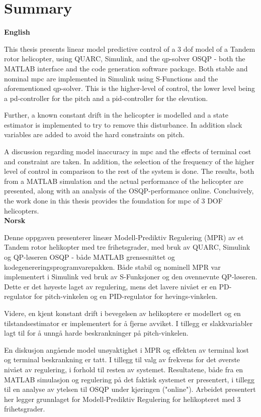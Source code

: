 
\chapter*{Summary}

\textbf{\Large{English}}

This thesis presents linear model predictive control of a 3 \acrshort{dof} model of a Tandem rotor helicopter, using QUARC, Simulink, and the \acrshort{qp}-solver OSQP - both the MATLAB interface and the code generation software package. Both stable and nominal \acrshort{mpc} are implemented in Simulink using S-Functions and the aforementioned \acrshort{qp}-solver. This is the higher-level of control, the lower level being a \acrshort{pd}-controller for the pitch and a \acrshort{pid}-controller for the elevation.

Further, a known constant drift in the helicopter is modelled and a state estimator is implemented to try to remove this disturbance. In addition slack variables are added to avoid the  hard constraints on pitch. 

A discussion regarding model inaccuracy in \acrshort{mpc} and the effects of terminal cost and constraint are taken. In addition, the selection of the frequency of the higher level of control in comparison to the rest of the system is done. The results, both from a MATLAB simulation and the actual performance of the helicopter are presented, along with an analysis of the OSQP-performance online. Conclusively, the work done in this thesis provides the foundation for \acrlong{mpc} of 3 DOF helicopters.  \\



\textbf{\Large{Norsk}}

Denne oppgaven presenterer lineær Modell-Prediktiv Regulering (MPR) av et Tandem rotor helikopter med tre frihetsgrader, med bruk av QUARC, Simulink og QP-løseren OSQP - både MATLAB grensesnittet og kodegenereringsprogramvarepakken. Både stabil og nominell MPR var implementert i Simulink ved bruk av S-Funksjoner og den ovennevnte QP-løseren. Dette er det høyeste laget av regulering, mens det lavere nivået er en PD-regulator for pitch-vinkelen og en PID-regulator for hevings-vinkelen. 

Videre, en kjent konstant drift i bevegelsen av helikoptere er modellert og en tilstandsestimator er implementert for å fjerne avviket. I tillegg er slakkvariabler lagt til for å unngå harde beskrankninger på pitch-vinkelen.

En diskusjon angående model unøyaktighet i MPR og effekten av terminal kost og terminal beskrankning er tatt. I tillegg til valg av frekvens for det øverste nivået av regulering, i forhold til resten av systemet. Resultatene, både fra en MATLAB simulasjon og regulering på det faktisk systemet er presentert, i tillegg til en analyse av ytelsen til OSQP under kjøringen ("online"). Arbeidet presentert her legger grunnlaget for Modell-Prediktiv Regulering for helikopteret med 3 frihetsgrader.